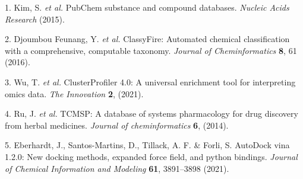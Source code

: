\documentclass[
]{article}
\newenvironment{cslreferences}%
  {}%
  {\par}
\begin{document}
\hypertarget{refs}{}
\begin{cslreferences}
\leavevmode\hypertarget{ref-PubchemSubstanKimS2015}{}%
1. Kim, S. \emph{et al.} PubChem substance and compound databases. \emph{Nucleic Acids Research} (2015).

\leavevmode\hypertarget{ref-ClassyfireAutDjoumb2016}{}%
2. Djoumbou Feunang, Y. \emph{et al.} ClassyFire: Automated chemical classification with a comprehensive, computable taxonomy. \emph{Journal of Cheminformatics} \textbf{8}, 61 (2016).

\leavevmode\hypertarget{ref-ClusterprofilerWuTi2021}{}%
3. Wu, T. \emph{et al.} ClusterProfiler 4.0: A universal enrichment tool for interpreting omics data. \emph{The Innovation} \textbf{2}, (2021).

\leavevmode\hypertarget{ref-TcmspADatabaRuJi2014}{}%
4. Ru, J. \emph{et al.} TCMSP: A database of systems pharmacology for drug discovery from herbal medicines. \emph{Journal of cheminformatics} \textbf{6}, (2014).

\leavevmode\hypertarget{ref-AutodockVina1Eberha2021}{}%
5. Eberhardt, J., Santos-Martins, D., Tillack, A. F. \& Forli, S. AutoDock vina 1.2.0: New docking methods, expanded force field, and python bindings. \emph{Journal of Chemical Information and Modeling} \textbf{61}, 3891--3898 (2021).
\end{cslreferences}
\end{document}
